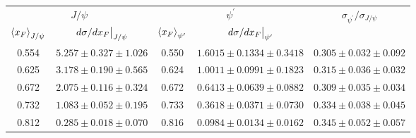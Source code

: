 \begin{tabular}{cc|cc|c}
\hline
\multicolumn{2}{c|}{$J/\psi$} &
  \multicolumn{2}{c|}{$\psi^{\prime}$} &
  \multirow{2}{*}{$\sigma_{\psi^\prime}/\sigma_{J/\psi}$} \\ \cline{1-4}
$\expval{x_F}_{J/\psi}$ &
  $\eval{d\sigma/dx_F}_{J/\psi}$ &
  $\expval{x_F}_{\psi^\prime}$ &
  $\eval{d\sigma/dx_F}_{\psi^\prime}$ &
   \\ \hline
0.554 & $5.257\pm0.327\pm1.026$ & 0.550 & $1.6015\pm0.1334\pm0.3418$ & $0.305\pm0.032\pm0.092$ \\
0.625 & $3.178\pm0.190\pm0.565$ & 0.624 & $1.0011\pm0.0991\pm0.1823$ & $0.315\pm0.036\pm0.032$ \\
0.672 & $2.075\pm0.116\pm0.324$ & 0.672 & $0.6413\pm0.0639\pm0.0882$ & $0.309\pm0.035\pm0.034$ \\
0.732 & $1.083\pm0.052\pm0.195$ & 0.733 & $0.3618\pm0.0371\pm0.0730$ & $0.334\pm0.038\pm0.045$ \\
0.812 & $0.285\pm0.018\pm0.070$ & 0.816 & $0.0984\pm0.0134\pm0.0162$ & $0.345\pm0.052\pm0.057$ \\ \hline
\end{tabular}
